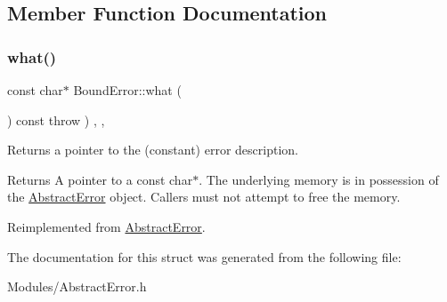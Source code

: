\subsection{Member Function Documentation}
\mbox{\label{structBoundError_a58ec01d9e329a9604cda74a8c273879a}} 
\subsubsection{\texorpdfstring{what()}{what()}}
{\footnotesize\ttfamily const char$\ast$ Bound\+Error\+::what (\begin{DoxyParamCaption}{ }\end{DoxyParamCaption}) const throw  ) \hspace{0.3cm}{\ttfamily [inline]}, {\ttfamily [override]}, {\ttfamily [virtual]}}

Returns a pointer to the (constant) error description. \begin{DoxyReturn}{Returns}
A pointer to a const char$\ast$. The underlying memory is in possession of the \hyperlink{classAbstractError}{Abstract\+Error} object. Callers must not attempt to free the memory. 
\end{DoxyReturn}


Reimplemented from \hyperlink{classAbstractError_a19735c7a9b5f6e84db606292967667a9}{Abstract\+Error}.



The documentation for this struct was generated from the following file\+:\begin{DoxyCompactItemize}
\item 
Modules/Abstract\+Error.\+h\end{DoxyCompactItemize}
